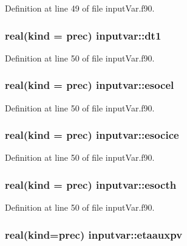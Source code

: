 Definition at line 49 of file input\-Var.\-f90.

\hypertarget{classinputvar_a62c9f9492040ef5e03091380533f2c0f}{
\subsubsection[{dt1}]{\setlength{\rightskip}{0pt plus 5cm}real(kind = prec) inputvar\-::dt1}}\label{classinputvar_a62c9f9492040ef5e03091380533f2c0f}


Definition at line 50 of file input\-Var.\-f90.

\hypertarget{classinputvar_a761214782c22ee31b6da74c0984cb9e2}{
\subsubsection[{esocel}]{\setlength{\rightskip}{0pt plus 5cm}real(kind = prec) inputvar\-::esocel}}\label{classinputvar_a761214782c22ee31b6da74c0984cb9e2}


Definition at line 50 of file input\-Var.\-f90.

\hypertarget{classinputvar_a776d3af64b707011e9ee688472f48ce1}{
\subsubsection[{esocice}]{\setlength{\rightskip}{0pt plus 5cm}real(kind = prec) inputvar\-::esocice}}\label{classinputvar_a776d3af64b707011e9ee688472f48ce1}


Definition at line 50 of file input\-Var.\-f90.

\hypertarget{classinputvar_a144453fc737cf5fa64bf329abb73d1c6}{
\subsubsection[{esocth}]{\setlength{\rightskip}{0pt plus 5cm}real(kind = prec) inputvar\-::esocth}}\label{classinputvar_a144453fc737cf5fa64bf329abb73d1c6}


Definition at line 50 of file input\-Var.\-f90.

\hypertarget{classinputvar_aeb72fc2d7eca7ba95a0fd6dbb0238cf0}{
\subsubsection[{etaauxpv}]{\setlength{\rightskip}{0pt plus 5cm}real(kind=prec) inputvar\-::etaauxpv}}\label{classinputvar_aeb72fc2d7eca7ba95a0fd6dbb0238cf0}


